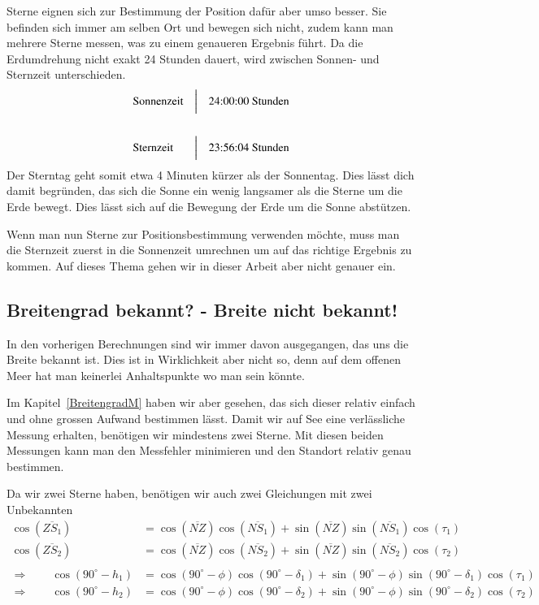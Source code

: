 \begin{refsection}
Sterne eignen sich zur Bestimmung der Position dafür aber umso besser. Sie befinden sich immer am selben Ort und bewegen sich nicht, zudem kann man mehrere Sterne messen, was zu einem genaueren Ergebnis führt. Da die Erdumdrehung nicht exakt 24 Stunden dauert, wird zwischen Sonnen- und Sternzeit unterschieden.
\[
\begin{aligned}
&\text{Sonnenzeit}
&
&\text{\bigg \vert}
&
&\text{24:00:00 Stunden}
\\
\\
&\text{Sternzeit}
&
&\text{\bigg \vert}
&
&\text{23:56:04 Stunden}
\end{aligned}
\]
Der Sterntag geht somit etwa 4 Minuten kürzer als der Sonnentag. Dies lässt dich damit begründen, das sich die Sonne ein wenig langsamer als die Sterne um die Erde bewegt. Dies lässt sich auf die Bewegung der Erde um die Sonne abstützen.

Wenn man nun Sterne zur Positionsbestimmung verwenden möchte, muss man die Sternzeit zuerst in die Sonnenzeit umrechnen um auf das richtige Ergebnis zu kommen. Auf dieses Thema gehen wir in dieser Arbeit aber nicht genauer ein.


\subsection{Breitengrad bekannt? - Breite nicht bekannt!}
In den vorherigen Berechnungen sind wir immer davon ausgegangen, das uns die Breite bekannt ist. Dies ist in Wirklichkeit aber nicht so, denn auf dem offenen Meer hat man keinerlei Anhaltspunkte wo man sein könnte.

Im Kapitel~\ref{BreitengradM}  haben wir aber gesehen, das sich dieser relativ einfach und ohne grossen Aufwand bestimmen lässt. Damit wir auf See eine verlässliche Messung erhalten, benötigen wir mindestens zwei Sterne. Mit diesen beiden Messungen kann man den Messfehler minimieren und den Standort relativ genau bestimmen.

Da wir zwei Sterne haben, benötigen wir auch zwei Gleichungen mit zwei Unbekannten
\begin{align*}
\cos(\overline{ZS_1}) &= \cos(\overline{NZ}) \cos(\overline{NS_1}) + \sin(\overline{NZ}) \sin(\overline{NS_1}) \cos(\tau_1) \\
\cos(\overline{ZS_2}) &= \cos(\overline{NZ}) \cos(\overline{NS_2}) + \sin(\overline{NZ}) \sin(\overline{NS_2}) \cos(\tau_2) \\
\\
\Rightarrow \quad \quad
\cos(90^{\circ} - h_1) &= \cos(90^{\circ} - \phi) \cos(90^{\circ} - \delta_1) + \sin(90^{\circ} - \phi)\sin(90^{\circ} - \delta_1) \cos(\tau_1) \\
\Rightarrow \quad \quad
\cos(90^{\circ} - h_2) &= \cos(90^{\circ} - \phi) \cos(90^{\circ} - \delta_2) + \sin(90^{\circ} - \phi)\sin(90^{\circ} - \delta_2) \cos(\tau_2)
\end{align*}


\end{refsection}
